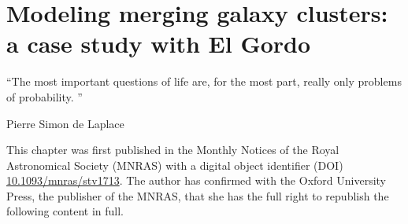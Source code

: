
\doublespacing
\setcounter{chapter}{1}
\chapter{Modeling merging galaxy clusters: a case study with El Gordo}{}{}

\label{chapter2}
\epigraph{``The most important questions of life are, for the most part, really only problems of probability.
''}{Pierre Simon de Laplace} 

This chapter was first published in the Monthly Notices of the Royal Astronomical
Society (MNRAS) with a digital object identifier (DOI)
\href{http://mnras.oxfordjournals.org/content/453/2/1531}{10.1093/mnras/stv1713}. 
The author has confirmed with the Oxford University Press, the publisher 
of the MNRAS, that she has the full right to republish the following content in
full.
		 

